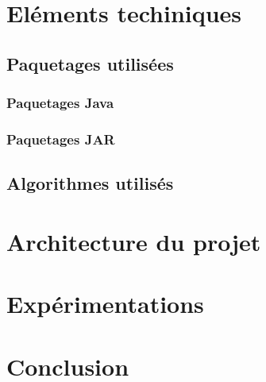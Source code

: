 \documentclass[french,12pt]{article}
\begin{document}
\section{Eléments techiniques} \label{elemtech}

\subsection{Paquetages utilisées}

\subsubsection{Paquetages Java}

\subsubsection{Paquetages JAR}

\subsection{Algorithmes utilisés}

\section{Architecture du projet} \label{architecture}

\section{Expérimentations} \label{experimentations}

\section{Conclusion} \label{conclusion}
\end{document}
